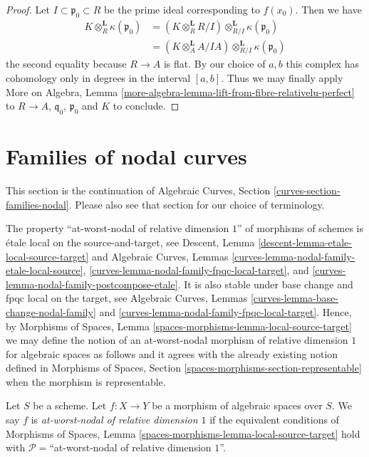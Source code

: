\begin{proof}
\medskip\noindent
Let $I \subset \mathfrak p_0 \subset R$ be the prime
ideal corresponding to $f(x_0)$. Then we have
\begin{align*}
K \otimes_R^\mathbf{L} \kappa(\mathfrak p_0)
& =
(K \otimes_R^\mathbf{L} R/I) \otimes_{R/I}^\mathbf{L}
\kappa(\mathfrak p_0) \\
& =
(K \otimes_A^\mathbf{L} A/IA) \otimes_{R/I}^\mathbf{L} \kappa(\mathfrak p_0)
\end{align*}
the second equality because $R \to A$ is flat.
By our choice of $a, b$ this complex has cohomology
only in degrees in the interval $[a, b]$.
Thus we may finally apply
More on Algebra, Lemma
\ref{more-algebra-lemma-lift-from-fibre-relativelu-perfect}
to $R \to A$, $\mathfrak q_0$, $\mathfrak p_0$ and $K$
to conclude.
\end{proof}







\section{Families of nodal curves}
\label{section-families-nodal}

\noindent
This section is the continuation of
Algebraic Curves, Section \ref{curves-section-families-nodal}.
Please also see that section for our choice
of terminology.

\medskip\noindent
The property ``at-worst-nodal of relative dimension $1$''
of morphisms of schemes is \'etale local on the source-and-target, see
Descent, Lemma \ref{descent-lemma-etale-local-source-target}
and
Algebraic Curves, Lemmas \ref{curves-lemma-nodal-family-etale-local-source},
\ref{curves-lemma-nodal-family-fpqc-local-target}, and
\ref{curves-lemma-nodal-family-postcompose-etale}.
It is also stable under base change and fpqc local on the target, see
Algebraic Curves, Lemmas \ref{curves-lemma-base-change-nodal-family} and
\ref{curves-lemma-nodal-family-fpqc-local-target}. Hence, by
Morphisms of Spaces, Lemma \ref{spaces-morphisms-lemma-local-source-target}
we may define the notion of an at-worst-nodal morphism of relative
dimension $1$ for algebraic spaces as follows and it agrees with the
already existing notion defined in
Morphisms of Spaces, Section \ref{spaces-morphisms-section-representable}
when the morphism is representable.

\begin{definition}
\label{definition-nodal-family}
Let $S$ be a scheme.
Let $f : X \to Y$ be a morphism of algebraic spaces over $S$.
We say $f$ is {\it at-worst-nodal of relative dimension $1$}
if the equivalent conditions of
Morphisms of Spaces, Lemma \ref{spaces-morphisms-lemma-local-source-target}
hold with $\mathcal{P} =$``at-worst-nodal of relative dimension $1$''.
\end{definition}


